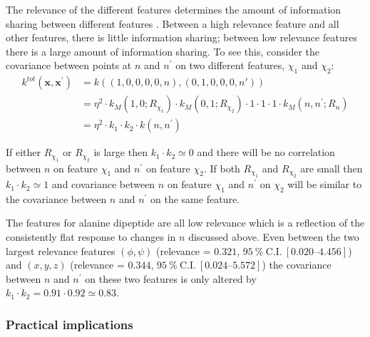 The relevance of the different features determines the amount of information sharing between different features \cite{duvenaud2011additive}. Between a high relevance feature and all other features, there is little information sharing; between low relevance features there is a large amount of information sharing. To see this, consider the covariance between points at $n$ and $n^{\prime}$ on two different features, $\chi_1$ and $\chi_2$: 
\begin{equation*}
\begin{split}
    k^{tot}(\mathbf{x}, \mathbf{x}^{\prime})& = k\left((1, 0, 0, 0, 0, n), (0, 1, 0, 0, 0, n')\right) \\
    & = \eta^{2}\cdot k_{M}\left(1, 0; R_{\chi_1}\right) \cdot k_{M}\left(0, 1; R_{\chi_2}\right) \cdot 1 \cdot 1\cdot 1 \cdot k_{M}(n, n^{\prime}; R_{n}) \\
    &=  \eta^{2}\cdot k_{1}\cdot k_{2}\cdot k(n, n^{\prime})
\end{split}
\end{equation*}

If either $R_{\chi_1}$ or $R_{\chi_2}$ is large then $k_1 \cdot k_2 \simeq 0$ and there will be no correlation between $n$ on feature $\chi_1$ and $n^{\prime}$ on feature $\chi_2$. If both $R_{\chi_1}$ and $R_{\chi_2}$ are small then $k_1 \cdot k_2 \simeq 1$ and covariance between $n$ on feature $\chi_1$ and $n^{\prime}$ on $\chi_2$ will be similar to the covariance between $n$ and $n^{\prime}$ on the same feature.  

The features for alanine dipeptide are all low relevance which is a reflection of the  consistently flat response to changes in $n$ discussed above. Even between  the two largest relevance features $(\phi, \psi)$ (relevance = $0.321$, $\SI{95}{\percent}\ \mathrm{C.I.}\ [\numrange[range-phrase=\text{--}]{0.020}{4.456}]$) and $(x,y,z)$ (relevance = $0.344$, $\SI{95}{\percent}\ \mathrm{C.I.}\ [\numrange[range-phrase=\text{--}]{0.024}{5.572}]$) the covariance between $n$ and $n^{\prime}$ on these two features is only altered by  $k_{1}\cdot k_{2} = 0.91\cdot0.92 \simeq 0.83$. 

\subsubsection{Practical implications}

